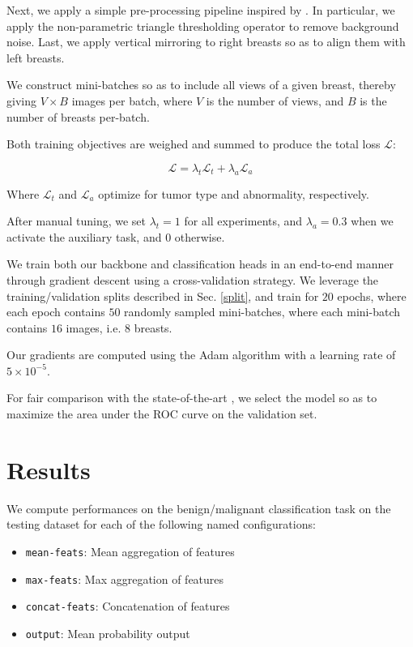 \documentclass[11pt]{article}
\begin{document}
Next, we apply a simple pre-processing pipeline inspired by \autocite{walsh22}.
In particular, we apply the non-parametric triangle thresholding operator \autocite{zack77}
to remove background noise.
Last, we apply vertical mirroring to right breasts so as to align them with left breasts.

We construct mini-batches so as to include all views of a given breast, thereby
giving \(V \times B\) images per batch, where \(V\) is the number of views,
and \(B\) is the number of breasts per-batch.

Both training objectives are weighed and summed to produce
the total loss \(\mathcal{L}\):

\begin{equation}
\mathcal{L} = \lambda_{t}\mathcal{L}_{t} + \lambda_{a}\mathcal{L}_{a}
\end{equation}

Where \(\mathcal{L}_t\) and \(\mathcal{L}_a\) optimize for tumor type
and abnormality, respectively.

After manual tuning, we set \(\lambda_t=1\) for all experiments,
and \(\lambda_a=0.3\) when we activate the auxiliary task, and \(0\) otherwise.

We train both our backbone and classification heads in an end-to-end manner through
gradient descent using a cross-validation strategy.
We leverage the training/validation splits described in Sec. \ref{split}, and train for
\(20\) epochs, where each epoch contains \(50\) randomly sampled mini-batches,
where each mini-batch contains \(16\) images, i.e. \(8\) breasts.

Our gradients are computed using the Adam algorithm with a learning rate of
\(5 \times 10^{-5}\).

For fair comparison with the state-of-the-art \autocite{walsh22}, we select the model so
as to maximize the area under the ROC curve on the validation set.

\section{Results}
\label{sec:orgd9b48bc}

We compute performances on the benign/malignant classification task
on the testing dataset for each of the following named configurations:

\begin{itemize}
\item \texttt{mean-feats}: Mean aggregation of features
\item \texttt{max-feats}: Max aggregation of features
\item \texttt{concat-feats}: Concatenation of features
\item \texttt{output}: Mean probability output
\end{itemize}
\end{document}

